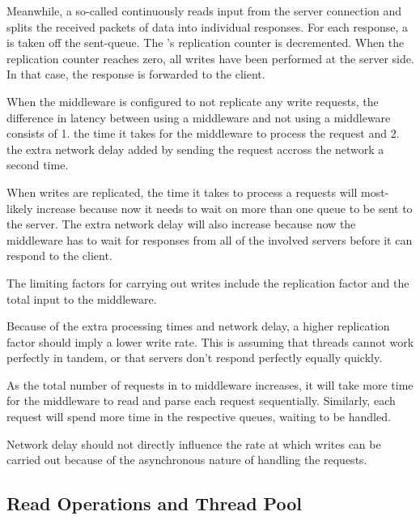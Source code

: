 \documentclass[11pt]{article}
\begin{document}
Meanwhile, a so-called  continuously reads input from the server connection and splits the received packets of data into individual responses.
For each response, a  is taken off the sent-queue.
The 's replication counter is decremented.
When the replication counter reaches zero, all writes have been performed at the server side.
In that case, the response is forwarded to the client.


When the middleware is configured to not replicate any write requests, the difference in latency between using a middleware and not using a middleware consists of 1. the time it takes for the middleware to process the request and 2. the extra network delay added by sending the request accross the network a second time.

When writes are replicated, the time it takes to process a requests will most-likely increase because now it needs to wait on more than one queue to be sent to the server.
The extra network delay will also increase because now the middleware has to wait for responses from all of the involved servers before it can respond to the client.

The limiting factors for carrying out writes include the replication factor and the total input to the middleware.

Because of the extra processing times and network delay, a higher replication factor should imply a lower write rate.
This is assuming that threads cannot work perfectly in tandem, or that servers don't respond perfectly equally quickly.

As the total number of requests in to middleware increases, it will take more time for the middleware to read and parse each request sequentially.
Similarly, each request will spend more time in the respective queues, waiting to be handled.

Network delay should not directly influence the rate at which writes can be carried out because of the asynchronous nature of handling the requests.

\subsection{Read Operations and Thread Pool}\label{sec:desc:reads}
\end{document}
